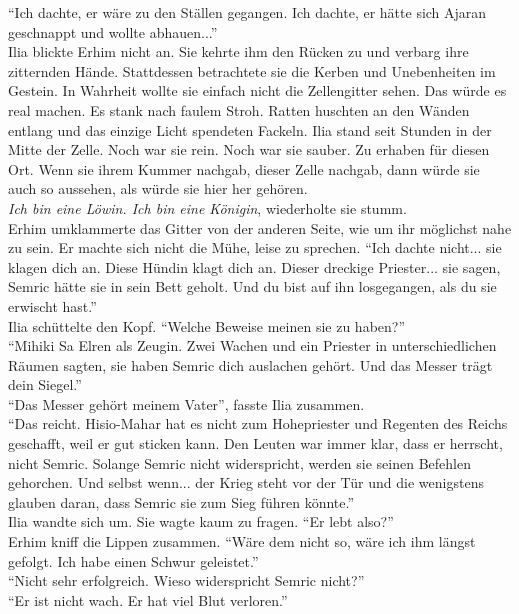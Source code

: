 ``Ich dachte, er wäre zu den Ställen gegangen. Ich dachte, er hätte sich Ajaran geschnappt und 
wollte abhauen...''\\
Ilia blickte Erhim nicht an. Sie kehrte ihm den Rücken zu und verbarg ihre zitternden Hände. 
Stattdessen betrachtete sie die Kerben und Unebenheiten im Gestein. In Wahrheit wollte sie einfach 
nicht die Zellengitter sehen. Das würde es real machen. Es stank nach faulem Stroh. Ratten huschten 
an den Wänden entlang und das einzige Licht spendeten Fackeln. Ilia stand seit Stunden in der Mitte 
der Zelle. Noch war sie rein. Noch war sie sauber. Zu erhaben für diesen Ort. Wenn sie ihrem Kummer 
nachgab, dieser Zelle nachgab, dann würde sie auch so aussehen, als würde sie hier her gehören.\\
\textit{Ich bin eine Löwin. Ich bin eine Königin}, wiederholte sie stumm.\\
Erhim umklammerte das Gitter von der anderen Seite, wie um ihr möglichst nahe zu sein. Er machte 
sich nicht die Mühe, leise zu sprechen. ``Ich dachte nicht... sie klagen dich an. Diese Hündin 
klagt dich an. Dieser dreckige Priester... sie sagen, Semric hätte sie in sein Bett geholt. Und du 
bist auf ihn losgegangen, als du sie erwischt hast.''\\
Ilia schüttelte den Kopf. ``Welche Beweise meinen sie zu haben?''\\
``Mihiki Sa Elren als Zeugin. Zwei Wachen und ein Priester in unterschiedlichen Räumen sagten, sie 
haben Semric dich auslachen gehört. Und das Messer trägt dein Siegel.''\\
``Das Messer gehört meinem Vater'', fasste Ilia zusammen.\\
``Das reicht. Hisio-Mahar hat es nicht zum Hohepriester und Regenten des Reichs geschafft, weil er 
gut sticken kann. Den Leuten war immer klar, dass er herrscht, nicht Semric. Solange Semric nicht 
widerspricht, werden sie seinen Befehlen gehorchen. Und selbst wenn... der Krieg steht vor der 
Tür und die wenigstens glauben daran, dass Semric sie zum Sieg führen könnte.''\\
Ilia wandte sich um. Sie wagte kaum zu fragen. ``Er lebt also?''\\
Erhim kniff die Lippen zusammen. ``Wäre dem nicht so, wäre ich ihm längst gefolgt. Ich habe einen 
Schwur geleistet.''\\
``Nicht sehr erfolgreich. Wieso widerspricht Semric nicht?''\\
``Er ist nicht wach. Er hat viel Blut verloren.''\\
